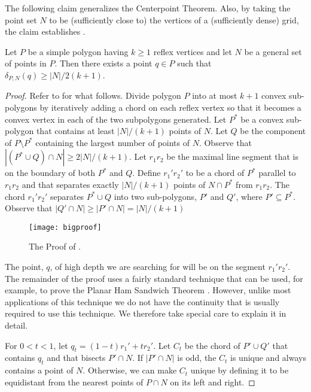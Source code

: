\documentclass{article}
\begin{document}
The following claim generalizes the Centerpoint Theorem.  Also, by
taking the point set $N$ to be (sufficiently close to) the vertices of
a (sufficiently dense) grid, the claim establishes
. 

\begin{clm} 
Let $P$ be a simple polygon having $k\ge 1$ reflex vertices and let
$N$ be a general set of points in $P$.  Then there exists a point
$q\in P$ such that $\delta_{P,N}(q) \ge |N|/2(k+1)$.
\end{clm}
\begin{proof}
Refer to  for what follows.  
Divide polygon $P$ into at most $k+1$ convex sub-polygons by
iteratively adding a chord on each reflex vertex so that it becomes a
convex vertex in each of the two subpolygons generated.  Let $P^*$ be
a convex sub-polygon that contains at least $|N|/(k+1)$ points of $N$.
Let $Q$ be the component of $P\setminus P^*$ containing the largest
number of points of $N$.  Observe that $|(P^*\cup Q)\cap N|\ge
2|N|/(k+1)$.  Let $r_1r_2$ be the maximal line segment that is on the
boundary of both
$P^*$ and $Q$.  Define $r_1'r_2'$ to be a chord of $P^*$ parallel to
$r_1r_2$ and that separates exactly $|N|/(k+1)$ points of
$N\cap P^*$ from $r_1r_2$. 
The chord $r_1'r_2'$ separates $P^*\cup Q$
into two sub-polygons, $P'$ and $Q'$, where $P'\subseteq P^*$.
Observe that $|Q'\cap N|\ge |P'\cap N| = |N|/(k+1)$

\begin{figure}
  \begin{center}
    \texttt{[image: bigproof]}
  \end{center}
  \caption{The Proof of .}
\end{figure}

The point, $q$, of high depth we are searching for will be on the
segment $r_1'r_2'$. The remainder of the proof uses a fairly standard
technique that can be used, for example, to prove the Planar Ham
Sandwich Theorem \cite{m03}. However, unlike most applications of this
technique we do not have the continuity that is usually required to
use this technique.  We therefore take special care to explain it in
detail.
 
For $0< t< 1$, let $q_t = (1-t)r_1'+ tr_2'$.  Let $C_t$ be the chord of
$P'\cup Q'$ that contains $q_t$ and that bisects $P'\cap N$.  If
$|P'\cap N|$ is odd, the $C_t$ is unique and always contains a point
of $N$.  Otherwise, we can make $C_t$ unique by defining it to be
equidistant from the nearest points of $P\cap N$ on its left and
right.


\end{proof}
\end{document}
